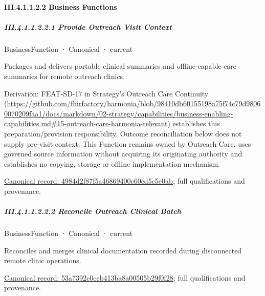 \paragraph*{III.4.1.1.2.2 Business Functions}
\label{navigation:III.4.1.1.2.2}

\subparagraph*{III.4.1.1.2.2.1 Provide Outreach Visit Context}
\label{navigation:III.4.1.1.2.2.1}

\label{element:4984d2f87f5a46869400c60cd5c5e0ab}
{\small BusinessFunction · Canonical · current}\par

Packages and delivers portable clinical summaries and offline-capable care summaries for remote outreach clinics.



Derivation: FEAT-SD-17 in Strategy's Outreach Care Continuity (\url{https://github.com/fhirfactory/harmonia/blob/98410db60155198a75f74c79d98060070209faa1/docs/markdown/02-strategy/capabilities/business-enabling-capabilities.md#15-outreach-care-harmonia-relevant}) establishes this preparation/provision responsibility. Outcome reconciliation below does not supply pre-visit context. This Function remains owned by Outreach Care, uses governed source information without acquiring its originating authority and establishes no copying, storage or offline implementation mechanism.


{\footnotesize \href{../../../../continuum/business/business-function/4984d2f87f5a46869400c60cd5c5e0ab.md}{Canonical record: 4984d2f87f5a46869400c60cd5c5e0ab}; full qualifications and provenance.}\par
\subparagraph*{III.4.1.1.2.2.2 Reconcile Outreach Clinical Batch}
\label{navigation:III.4.1.1.2.2.2}

\label{element:53a7392c0ceb413ba8a00505b29f0f28}
{\small BusinessFunction · Canonical · current}\par

Reconciles and merges clinical documentation recorded during disconnected remote clinic operations.


{\footnotesize \href{../../../../continuum/business/business-function/53a7392c0ceb413ba8a00505b29f0f28.md}{Canonical record: 53a7392c0ceb413ba8a00505b29f0f28}; full qualifications and provenance.}\par
